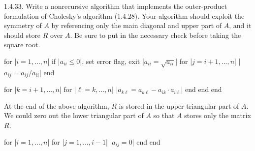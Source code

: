 \documentclass{report}
\begin{document}
    

    \pagebreak \bigbreak \noindent 
    \begin{mdframed}
        1.4.33. Write a nonrecursive algorithm that implements the outer-product formulation of Cholesky's algorithm (1.4.28). Your algorithm should exploit the symmetry of $A$ by referencing only the main diagonal and upper part of $A$, and it should store $R$ over $A$. Be sure to put in the necessary check before taking the square root.
    \end{mdframed}
    \bigbreak \noindent 
    \begin{jlcode}
        for |$i = 1,...,n$|
            if |$a_{ii} \leq 0$|, set error flag, exit
            |$a_{ii} = \sqrt{a_{ii}}$|
            for |$j = i+1,...,n$|
                |$a_{ij} = a_{ij} / a_{ii}$|
            end

            for |$k = i+1,...,n$|
                for |$\ell = k,...,n$|
                    |$a_{k\ell} = a_{k\ell} - a_{ik} \cdot a_{i\ell}$|
                end
            end
        end
    \end{jlcode}
    \bigbreak \noindent 
    At the end of the above algorithm, $R$ is stored in the upper triangular part of $A$. We could zero out the lower triangular part of $A$ so that $A$ stores only the matrix $R$.
    \bigbreak \noindent 
    \begin{jlcode}
    for |$i=1,...,n$|
        for |$j = 1,...,i-1$|
            |$a_{ij} = 0$|
        end
    end
    \end{jlcode}
\end{document}
